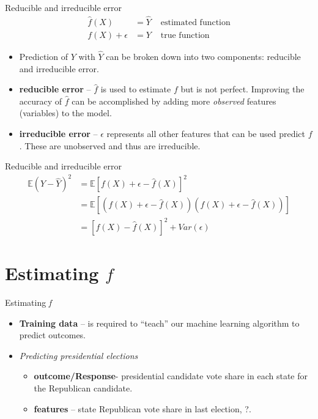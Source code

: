 \documentclass{beamer}
\begin{document}
\begin{frame}{Reducible and irreducible error} %
\begin{align*}
		\hat{f}(X) & = \hat{Y} & \text{ estimated function} \\
		 f(X) + \epsilon  & = Y  & \text{ true function} 
\end{align*}

 \begin{itemize}
 		\item Prediction of $Y$ with $\hat{Y}$ can be broken down into two components: reducible and irreducible error.
 		\item \textbf{reducible error} -- $\hat{f}$ is used to estimate $f$ but is not perfect. Improving the accuracy of $\hat{f}$ can be accomplished by adding more \textit{observed} features (variables) to the model.
 		\item \textbf{irreducible error} -- $\epsilon$ represents all other features that can be used predict $f$. These are unobserved and thus are irreducible.
 \end{itemize}
\end{frame}

\begin{frame}{Reducible and irreducible error} %
\begin{align*}
		\mathbb{E}(Y-\hat{Y})^{2} & = \mathbb{E}[ f(X) + \epsilon - \hat{f}(X)]^{2} \\
			     				 & = \mathbb{E}[(f(X) + \epsilon - \hat{f}(X))(f(X) + \epsilon - \hat{f}(X))] \\
			     				 & = [f(X) - \hat{f}(X)]^{2} + Var(\epsilon)
\end{align*}

\end{frame}


\section*{Estimating $f$}

\begin{frame}{Estimating \textit{f}} %

\begin{itemize}
	\item \textbf{Training data} -- is required to ``teach'' our machine learning algorithm to predict outcomes. 
	\item \textit{Predicting presidential elections}
		\begin{itemize}
			\item \textbf{outcome/Response}- presidential candidate vote share in each state for the Republican candidate.
			\item \textbf{features} -- state Republican vote share in last election, ?.
		\end{itemize}
\end{itemize}

\end{frame}
\end{document}
